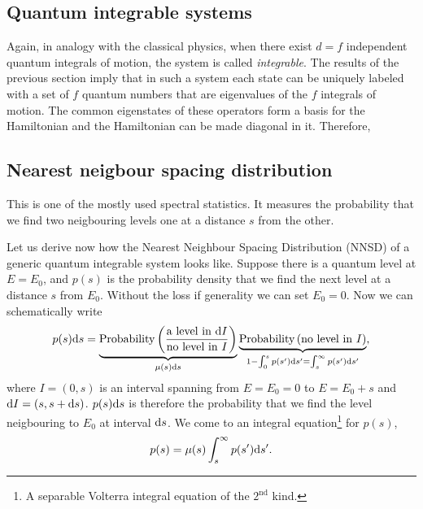 \documentclass[a4paper,11pt,twoside]{article}
\begin{document}
    \subsection{Quantum integrable systems}
        Again, in analogy with the classical physics, when there exist $d=f$ independent quantum integrals of motion, the system is called \emph{integrable}.
        The results of the previous section imply that in such a system each state can be uniquely labeled with a set of $f$ quantum numbers that are eigenvalues of the $f$ integrals of motion.
        The common eigenstates of these operators form a basis for the Hamiltonian and the Hamiltonian can be made diagonal in it.
        Therefore, 

    \subsection{Nearest neigbour spacing distribution}
        This is one of the mostly used spectral statistics.
        It measures the probability that we find two neigbouring levels one at a distance $s$ from the other.

        Let us derive now how the Nearest Neighbour Spacing Distribution (NNSD) of a generic quantum integrable system looks like.
        Suppose there is a quantum level at $E=E_{0}$, and $p(s)$ is the probability density that we find the next level at a distance $s$ from $E_{0}$.  
        Without the loss if generality we can set $E_{0}=0$.
        Now we can schematically write 
        \begin{equation}
            p(s)\mathrm{d} s
                =\underbrace{\text{Probability}\left(\frac{\text{a level in }\mathrm{d} I}{\text{no level in }I}\right)}_{\mu(s)\mathrm{d} s}
                \underbrace{\text{Probability}\left(\text{no level in }I\right)}_{1-\int_{0}^{s}p(s')\mathrm{d} s'=\int_{s}^{\infty}p(s')\mathrm{d} s'},
        \end{equation}
        where $I=(0,s)$ is an interval spanning from $E=E_{0}=0$ to $E=E_{0}+s$ and $\mathrm{d} I=(s,s+\mathrm{d} s)$.
        $p(s)\mathrm{d} s$ is therefore the probability that we find the level neigbouring to $E_{0}$ at interval $\mathrm{d} s$.
        We come to an integral equation\footnote{A separable Volterra integral equation of the $2^{\text{nd}}$ kind.} for $p(s)$,
        \begin{equation}
            p(s)=\mu(s)\int_{s}^{\infty}p(s')\mathrm{d} s'.
        \end{equation}
        
\end{document}
